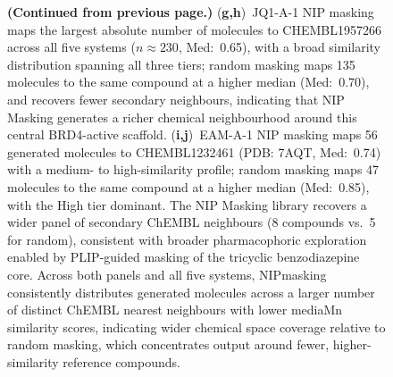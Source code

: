 \documentclass[a4paper,12pt]{article}
\begin{document}
\begin{figure}[p]
    \caption{%
        \textbf{(Continued from previous page.)}
        (\textbf{g,h})~JQ1-A-1 NIP masking maps the largest absolute number
        of molecules to CHEMBL1957266 across all five systems
        ($n \approx 230$, Med:~0.65), with a broad similarity
        distribution spanning all three tiers; random masking maps
        135 molecules to the same compound at a higher median
        (Med:~0.70), and recovers fewer secondary neighbours,
        indicating that NIP Masking generates a richer chemical neighbourhood
        around this central BRD4-active scaffold.
        (\textbf{i,j})~EAM-A-1 NIP masking maps 56 generated molecules to
        CHEMBL1232461 (PDB: 7AQT, Med:~0.74) with a medium- to
        high-similarity profile; random masking maps 47 molecules
        to the same compound at a higher median (Med:~0.85),
        with the High tier dominant.
        The NIP Masking library recovers a wider panel of secondary ChEMBL
        neighbours (8 compounds vs.\ 5 for random), consistent
        with broader pharmacophoric exploration enabled by
        PLIP-guided masking of the tricyclic benzodiazepine core.
        Across both panels and all five systems, NIPmasking
        consistently distributes generated molecules across a
        larger number of distinct ChEMBL nearest neighbours with
        lower mediaMn similarity scores, indicating wider chemical
        space coverage relative to random masking, which
        concentrates output around fewer, higher-similarity
        reference compounds.
    }
\end{figure}
\end{document}
